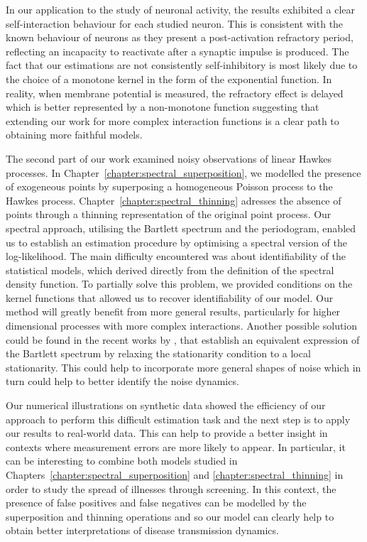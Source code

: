 In our application to the study of neuronal activity, the results exhibited a clear self-interaction behaviour for each studied neuron.
This is consistent with the known behaviour of neurons as they present a post-activation refractory period, reflecting an incapacity to reactivate 
after a synaptic impulse is produced.
The fact that our estimations are not consistently self-inhibitory is most likely due to the choice of a monotone kernel in the form of the exponential function.
In reality, when membrane potential is measured, the refractory effect is delayed which is better represented by a non-monotone function suggesting that extending our work for more complex interaction functions is a clear path to obtaining more faithful models.

\vspace{5mm}

The second part of our work examined noisy observations of linear Hawkes processes. 
In Chapter~\ref{chapter:spectral_superposition}, we modelled the presence of exogeneous points by superposing a homogeneous Poisson process to the Hawkes process.
Chapter~\ref{chapter:spectral_thinning} adresses the absence of points through a thinning representation of the original point process.
Our spectral approach, utilising the Bartlett spectrum and the periodogram, enabled us to establish an estimation procedure by optimising a spectral version of the log-likelihood.
The main difficulty encountered was about identifiability of the statistical models, which derived directly from the definition of the spectral density function.
To partially solve this problem, we provided conditions on the kernel functions that allowed us to recover identifiability of our model.
Our method will greatly benefit from more general results, particularly for higher dimensional processes with more complex interactions.
Another possible solution could be found in the recent works by \textcite{Roueff2016, Roueff2019}, that establish an equivalent expression of the Bartlett spectrum by relaxing the stationarity condition to a local stationarity. 
This could help to incorporate more general shapes of noise which in turn could help to better identify the noise dynamics.

Our numerical illustrations on synthetic data showed the efficiency of our approach to perform this difficult estimation task and the next step is to apply our results to real-world data.
This can help to provide a better insight in contexts where measurement errors are more likely to appear.
In particular, it can be interesting to combine both models studied in Chapters~\ref{chapter:spectral_superposition} and \ref{chapter:spectral_thinning}%
in order to study the spread of illnesses through screening.
In this context, the presence of false positives and false negatives can be modelled by the superposition and thinning operations and so our model can clearly help to obtain better interpretations of disease transmission dynamics.

